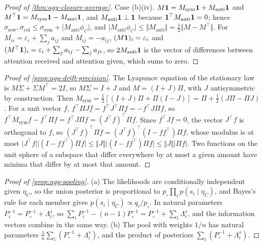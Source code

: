 \begin{proof}[Proof of \cref{thm:agy-closure-average}]
Case (b)(iv). $M\mathbf{1}=M_{\mathrm{sym}}\mathbf{1}+M_{\mathrm{anti}}\mathbf{1}$ and $M^\top\mathbf{1}=M_{\mathrm{sym}}\mathbf{1}-M_{\mathrm{anti}}\mathbf{1}$, and $M_{\mathrm{anti}}\mathbf{1}\perp\mathbf{1}$ because $\mathbf{1}^\top M_{\mathrm{anti}}\mathbf{1}=0$; hence $\sigma_{\mathrm{row}},\sigma_{\mathrm{col}}\le\sigma_{\mathrm{sym}}+\lvert M_{\mathrm{anti}}\phi_C\rvert$, and $\lvert M_{\mathrm{anti}}\phi_C\rvert\le\Vert M_{\mathrm{anti}}\Vert=\frac12\Vert M-M^\top\Vert$. For $M_{ii}=\varepsilon_i+\sum_ja_{ij}$ and $M_{ij}=-a_{ij}$, $(M\mathbf{1})_i=\varepsilon_i$ and $(M^\top\mathbf{1})_i=\varepsilon_i+\sum_ja_{ij}-\sum_ja_{ji}$, so $2M_{\mathrm{anti}}\mathbf{1}$ is the vector of differences between attention received and attention given, which sums to zero.
\end{proof}

\begin{proof}[Proof of \cref{prop:agy-drift-precision}]
The Lyapunov equation of the stationary law is $M\Sigma+\Sigma M^\top=2I$, so $M\Sigma=I+J$ and $M=(I+J)\Pi$, with $J$ antisymmetric by construction. Then $M_{\mathrm{sym}}=\frac12[(I+J)\Pi+\Pi(I-J)]=\Pi+\frac12(J\Pi-\Pi J)$. For a unit vector $f$, $f^\top\Pi Jf=f^\top J^\top\Pi f=-f^\top J\Pi f$, so $f^\top M_{\mathrm{sym}}f-f^\top\Pi f=f^\top J\Pi f=(J^\top f)^\top\Pi f$. Since $f^\top Jf=0$, the vector $J^\top f$ is orthogonal to $f$, so $(J^\top f)^\top\Pi f=(J^\top f)^\top(I-ff^\top)\Pi f$, whose modulus is at most $\lvert J^\top f\rvert\lvert(I-ff^\top)\Pi f\rvert\le\Vert J\Vert\lvert(I-ff^\top)\Pi f\rvert\le\Vert J\Vert\lvert\Pi f\rvert$. Two functions on the unit sphere of a subspace that differ everywhere by at most a given amount have minima that differ by at most that amount.
\end{proof}

\begin{proof}[Proof of \cref{prop:agy-pooling}]
(a) The likelihoods are conditionally independent given $\eta_C$, so the union posterior is proportional to $p_\circ\prod_ip(s_i\mid\eta_C)$, and Bayes's rule for each member gives $p(s_i\mid\eta_C)\propto q_i/p_\circ$. In natural parameters $P_i^{-1}=P_\circ^{-1}+\Lambda^s_i$, so $\sum_iP_i^{-1}-(n-1)P_\circ^{-1}=P_\circ^{-1}+\sum_i\Lambda^s_i$, and the information vectors combine in the same way. (b) The pool with weights $1/n$ has natural parameters $\frac1n\sum_i(P_\circ^{-1}+\Lambda^s_i)$, and the product of posteriors $\sum_i(P_\circ^{-1}+\Lambda^s_i)$.
\end{proof}

